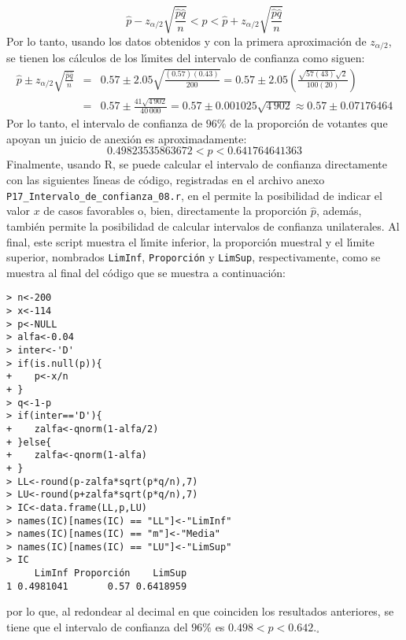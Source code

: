 \begin{solucion}
\begin{enumerate}
  \begin{equation*}
   \hat{p} - z_{\alpha/2}\sqrt{\frac{\hat{p}\hat{q}}{n}} < p < \hat{p} + z_{\alpha/2}\sqrt{\frac{\hat{p}\hat{q}}{n}}
  \end{equation*}
  Por lo tanto, usando los datos obtenidos y con la primera aproximaci\'on de $z_{\alpha/2}$, se tienen los c\'alculos de los l\'{\i}mites del intervalo de confianza como siguen:
  \begin{eqnarray*}
   \hat{p} \pm z_{\alpha/2}\sqrt{\frac{\hat{p}\hat{q}}{n}} & = & 0.57 \pm 2.05\sqrt{\frac{(0.57)(0.43)}{200}} = 0.57 \pm 2.05 \left( \frac{\sqrt{57(43)}\sqrt{2}}{100(20)} \right) \\
   & = & 0.57 \pm \frac{41\sqrt{4\,902}}{40\,000} = 0.57 \pm 0.001025\sqrt{4\,902} \approx 0.57 \pm 0.07176464
  \end{eqnarray*}
  Por lo tanto, el intervalo de confianza de $96\%$ de la proporci\'on de votantes que apoyan un juicio de anexi\'on es aproximadamente:
  \begin{equation*}
   0.49823535863672 < p < 0.641764641363
  \end{equation*}
  Finalmente, usando R, se puede calcular el intervalo de confianza directamente con las siguientes l\'{\i}neas de c\'odigo, registradas en el archivo anexo \texttt{P17\_Intervalo\_de\_confianza\_08.r}, en el permite la posibilidad de indicar el valor $x$ de casos favorables o, bien, directamente la proporci\'on $\hat{p}$, adem\'as, tambi\'en permite la posibilidad de calcular intervalos de confianza unilaterales. Al final, este script muestra el l\'{\i}mite inferior, la proporci\'on muestral y el l\'{\i}mite superior, nombrados \texttt{LimInf}, \texttt{Proporci\'on} y \texttt{LimSup}, respectivamente, como se muestra al final del c\'odigo que se muestra a continuaci\'on:
  \begin{verbatim}
> n<-200
> x<-114
> p<-NULL
> alfa<-0.04
> inter<-'D'
> if(is.null(p)){
+    p<-x/n
+ }
> q<-1-p
> if(inter=='D'){
+    zalfa<-qnorm(1-alfa/2)
+ }else{
+    zalfa<-qnorm(1-alfa)
+ }
> LL<-round(p-zalfa*sqrt(p*q/n),7)
> LU<-round(p+zalfa*sqrt(p*q/n),7)
> IC<-data.frame(LL,p,LU)
> names(IC)[names(IC) == "LL"]<-"LimInf"
> names(IC)[names(IC) == "m"]<-"Media"
> names(IC)[names(IC) == "LU"]<-"LimSup"
> IC
     LimInf Proporción    LimSup
1 0.4981041       0.57 0.6418959
  \end{verbatim}
  \vspace{-0.5cm}
  por lo que, al redondear al decimal en que coinciden los resultados anteriores, se tiene que el intervalo de confianza del $96\%$ es $0.498 < p < 0.642$.${}_{\square}$
  

\end{enumerate}
\end{solucion}
